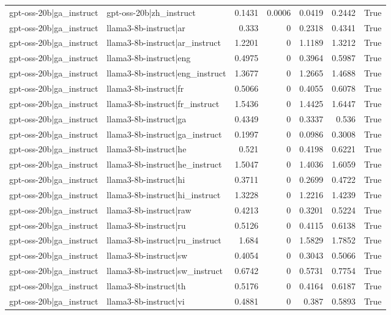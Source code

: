 \begin{table}
\begin{tabular}{l l r r r r l}
gpt-oss-20b|ga_instruct & gpt-oss-20b|zh_instruct & 0.1431 & 0.0006 & 0.0419 & 0.2442 & True \\
gpt-oss-20b|ga_instruct & llama3-8b-instruct|ar & 0.333 & 0 & 0.2318 & 0.4341 & True \\
gpt-oss-20b|ga_instruct & llama3-8b-instruct|ar_instruct & 1.2201 & 0 & 1.1189 & 1.3212 & True \\
gpt-oss-20b|ga_instruct & llama3-8b-instruct|eng & 0.4975 & 0 & 0.3964 & 0.5987 & True \\
gpt-oss-20b|ga_instruct & llama3-8b-instruct|eng_instruct & 1.3677 & 0 & 1.2665 & 1.4688 & True \\
gpt-oss-20b|ga_instruct & llama3-8b-instruct|fr & 0.5066 & 0 & 0.4055 & 0.6078 & True \\
gpt-oss-20b|ga_instruct & llama3-8b-instruct|fr_instruct & 1.5436 & 0 & 1.4425 & 1.6447 & True \\
gpt-oss-20b|ga_instruct & llama3-8b-instruct|ga & 0.4349 & 0 & 0.3337 & 0.536 & True \\
gpt-oss-20b|ga_instruct & llama3-8b-instruct|ga_instruct & 0.1997 & 0 & 0.0986 & 0.3008 & True \\
gpt-oss-20b|ga_instruct & llama3-8b-instruct|he & 0.521 & 0 & 0.4198 & 0.6221 & True \\
gpt-oss-20b|ga_instruct & llama3-8b-instruct|he_instruct & 1.5047 & 0 & 1.4036 & 1.6059 & True \\
gpt-oss-20b|ga_instruct & llama3-8b-instruct|hi & 0.3711 & 0 & 0.2699 & 0.4722 & True \\
gpt-oss-20b|ga_instruct & llama3-8b-instruct|hi_instruct & 1.3228 & 0 & 1.2216 & 1.4239 & True \\
gpt-oss-20b|ga_instruct & llama3-8b-instruct|raw & 0.4213 & 0 & 0.3201 & 0.5224 & True \\
gpt-oss-20b|ga_instruct & llama3-8b-instruct|ru & 0.5126 & 0 & 0.4115 & 0.6138 & True \\
gpt-oss-20b|ga_instruct & llama3-8b-instruct|ru_instruct & 1.684 & 0 & 1.5829 & 1.7852 & True \\
gpt-oss-20b|ga_instruct & llama3-8b-instruct|sw & 0.4054 & 0 & 0.3043 & 0.5066 & True \\
gpt-oss-20b|ga_instruct & llama3-8b-instruct|sw_instruct & 0.6742 & 0 & 0.5731 & 0.7754 & True \\
gpt-oss-20b|ga_instruct & llama3-8b-instruct|th & 0.5176 & 0 & 0.4164 & 0.6187 & True \\
gpt-oss-20b|ga_instruct & llama3-8b-instruct|vi & 0.4881 & 0 & 0.387 & 0.5893 & True \\

\end{tabular}
\end{table}
